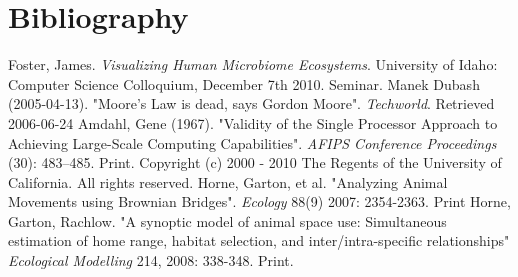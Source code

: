 



\section{Bibliography}

\begin{thebibliography}{99}
 Foster, James. {\em Visualizing Human Microbiome
        Ecosystems}. University of Idaho: Computer Science Colloquium, 
        December 7th 2010. Seminar.	
 Manek Dubash (2005-04-13). "Moore's Law is dead, says 
	Gordon Moore". {\em Techworld}. Retrieved 2006-06-24
 Amdahl, Gene (1967). "Validity of the Single Processor Approach to Achieving Large-Scale Computing Capabilities". {\em AFIPS Conference Proceedings} (30): 483–485. Print.
 Copyright (c) 2000 - 2010 The Regents of the University of California. All rights reserved.
 Horne, Garton, et al. "Analyzing Animal Movements using Brownian 
	Bridges". { \em Ecology } 88(9) 2007: 2354-2363. Print
 Horne, Garton, Rachlow. "A synoptic model of animal space use: 
	Simultaneous estimation of home range, habitat selection, and 
	inter/intra-speciﬁc relationships" {\em Ecological Modelling} 
	214, 2008: 338-348. Print.


\end{thebibliography}
